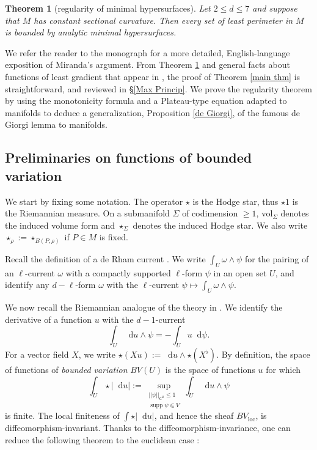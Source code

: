 \documentclass[reqno,10pt]{amsart}
\DeclareMathOperator{\supp}{supp}
\newcommand*\dif{\mathop{}\!\mathrm{d}}
\newcommand{\vol}{\mathrm{vol}}
\newcommand{\dfn}[1]{\emph{#1}\index{#1}}
\newcommand{\loc}{\mathrm{loc}}
\newtheorem{mainthm}{Theorem}
\theoremstyle{definition}
\numberwithin{equation}{section}
\begin{document}
\begin{mainthm}[regularity of minimal hypersurfaces]\label{main lma}
Let $2 \leq d \leq 7$ and suppose that $M$ has constant sectional curvature.
Then every set of least perimeter in $M$ is bounded by analytic minimal hypersurfaces.
\end{mainthm}

We refer the reader to the monograph \cite[Part 1]{Giusti77} for a more detailed, English-language exposition of Miranda's argument.
From Theorem \ref{main lma} and general facts about functions of least gradient that appear in \cite{Miranda67}, the proof of Theorem \ref{main thm} is straightforward, and reviewed in \S\ref{Max Princip}.
We prove the regularity theorem by using the monotonicity formula and a Plateau-type equation adapted to manifolds to deduce a generalization, Proposition \ref{de Giorgi}, of the famous de Giorgi lemma to manifolds.

\subsection{Preliminaries on functions of bounded variation}
We start by fixing some notation. The operator $\star$ is the Hodge star, thus $\star 1$ is the Riemannian measure.
On a submanifold $\Sigma$ of codimension $\geq 1$, $\vol_\Sigma$ denotes the induced volume form and $\star_\Sigma$ denotes the induced Hodge star. We also write $\star_\rho := \star_{B(P, \rho)}$ if $P \in M$ is fixed.

Recall the definition of a de Rham current \cite{simon1983GMT}.
We write $\int_U \omega \wedge \psi$ for the pairing of an $\ell$-current $\omega$ with a compactly supported $\ell$-form $\psi$ in an open set $U$, and identify any $d - \ell$-form $\omega$ with the $\ell$-current $\psi \mapsto \int_U \omega \wedge \psi$.

We now recall the Riemannian analogue of the theory in \cite[Chapter 1]{Giusti77}.
We identify the derivative of a function $u$ with the $d-1$-current
$$\int_U \dif u \wedge \psi = -\int_U u \dif \psi.$$
For a vector field $X$, we write $\star (Xu) := \dif u \wedge \star (X^\flat)$.
By definition, the space of functions of \dfn{bounded variation} $BV(U)$ is the space of functions $u$ for which
\begin{equation}\label{total variation}
\int_U \star |\dif u| := \sup_{\substack{||\psi||_{C^0} \leq 1\\\supp \psi \Subset V}} \int_U \dif u \wedge \psi
\end{equation}
is finite.
The local finiteness of $\int \star |\dif u|$, and hence the sheaf $BV_\loc$, is diffeomorphism-invariant.
Thanks to the diffeomorphism-invariance, one can reduce the following theorem to the euclidean case \cite[Teorema 1]{Miranda67}:
\end{document}
